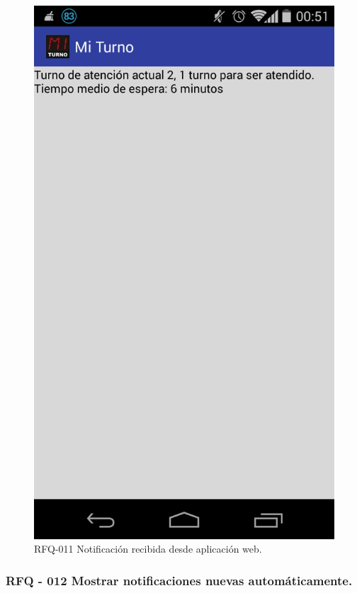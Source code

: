 \begin{figure}[H]
\centering
\includegraphics[scale=0.20]{images/capitulo6/rfq011.png}
\caption{RFQ-011 Notificación recibida desde aplicación web.}
\label{rfq011}
\end{figure}

\subsubsection{RFQ - 012 Mostrar notificaciones nuevas automáticamente.}

